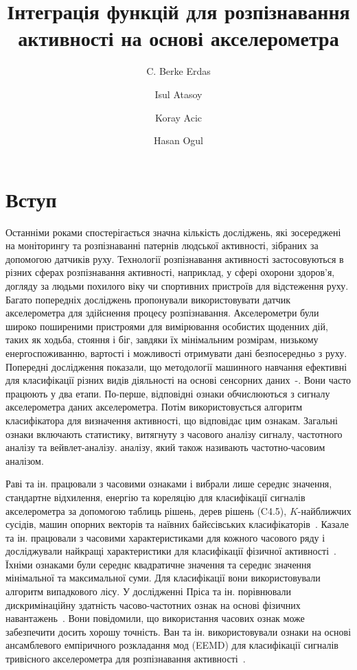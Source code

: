 \documentclass[]{iptconf}
\title{Інтеграція функцій для розпізнавання активності на основі акселерометра}
\author[]{C. Berke Erdas}{1}
\author{Isul Atasoy}{1}
\author{Koray Acic}{1}
\author{Hasan Ogul}{1}
\affiliation{Department of Computer Engineering, Başkent University, Ankara, Turkey}{1}
\begin{document}

\section{Вступ}

Останніми роками спостерігається значна кількість досліджень, які зосереджені на моніторингу та розпізнаванні патернів людської активності, зібраних за допомогою датчиків руху. Технології розпізнавання активності застосовуються в різних сферах розпізнавання активності, наприклад, у сфері охорони здоров'я, догляду за людьми похилого віку чи спортивних пристроїв для відстеження руху. Багато попередніх досліджень пропонували використовувати датчик акселерометра для здійснення процесу розпізнавання. Акселерометри були широко поширеними пристроями для вимірювання особистих щоденних дій, таких як ходьба, стояння і біг, завдяки їх мінімальним розмірам, низькому енергоспоживанню, вартості і можливості отримувати дані безпосередньо з руху. Попередні дослідження показали, що методології машинного навчання ефективні для класифікації різних видів діяльності на основі сенсорних даних~\cite{1}-\cite{9}. Вони часто працюють у два етапи. По-перше, відповідні ознаки обчислюються з сигналу акселерометра даних акселерометра. Потім використовується алгоритм класифікатора для визначення активності, що відповідає цим ознакам. Загальні ознаки включають статистику, витягнуту з часового аналізу сигналу, частотного аналізу та вейвлет-аналізу. аналізу, який також називають частотно-часовим аналізом.

Раві та ін. працювали з часовими ознаками і вибрали лише середнє значення, стандартне відхилення, енергію та кореляцію для класифікації сигналів акселерометра за допомогою таблиць рішень, дерев рішень (C4.5), $K$-найближчих сусідів, машин опорних векторів та наївних байєсівських класифікаторів~\cite{1}. Казале та ін. працювали з часовими характеристиками для кожного часового ряду і досліджували найкращі характеристики для класифікації фізичної активності~\cite{2}. Їхніми ознаками були середнє квадратичне значення та середнє значення мінімальної та максимальної суми. Для класифікації вони використовували алгоритм випадкового лісу. У дослідженні Пріса та ін. порівнювали дискримінаційну здатність часово-частотних ознак на основі фізичних навантажень~\cite{3}. Вони повідомили, що використання часових ознак може забезпечити досить хорошу точність. Ван та ін. використовували ознаки на основі ансамблевого емпіричного розкладання мод (EEMD) для класифікації сигналів тривісного акселерометра для розпізнавання активності~\cite{6}.
\end{document}
